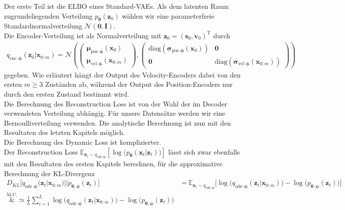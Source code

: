 \documentclass[12pt]{article}
\newcommand{\E}{\mathbb{E}}
\begin{document}
	Der erste Teil ist die ELBO eines Standard-VAEs.
	Als dem latenten Raum zugrundeliegenden Verteilung $p_{\boldsymbol\theta}(\mathbf{z}_{0})$ wählen wir eine parameterfreie Standardnormalverteilung $\mathcal{N}(\mathbf{0},\mathbf{I})$.\\
	Die Encoder-Verteilung ist als Normalverteilung mit $\mathbf{z}_{0} = (\mathbf{s}_{0},\mathbf{v}_{0})^{\mathrm{T}}$ durch
	\begin{align*}
	q_{\text{enc }\boldsymbol\phi}(\mathbf{z}_{0}|\mathbf{x}_{0:m}) =
	\mathcal{N}\left(\left(\begin{array}{cc}
	\boldsymbol\mu_{\text{pos }\boldsymbol\phi}(\textbf{x}_{0}) \\
	\boldsymbol\mu_{\text{vel }\boldsymbol\phi}(\textbf{x}_{0:m})
	\end{array}\right),\left(\begin{array}{cc}
	\text{diag}(\boldsymbol\sigma_{\text{pos }\boldsymbol\phi}(\textbf{x}_{0})) &
	\mathbf{0}\\
	\mathbf{0} &
	\text{diag}(\boldsymbol\sigma_{\text{vel }\boldsymbol\phi}(\textbf{x}_{0:m}))
	\end{array}\right)\right)
	\end{align*}
	gegeben. Wie erläutert hängt der Output des Velocity-Encoders dabei von den ersten $m\ge3$ Zuständen ab, während der Output des Position-Encoders nur durch den ersten Zustand bestimmt wird.\\
	Die Berechnung des Reconstruction Loss ist von der Wahl der im Decoder verwendeten Verteilung abhängig. Für unsere Datensätze werden wir eine Bernoulliverteilung verwenden.
	Die analytische Berechnung ist nun mit den Resultaten des letzten Kapitels möglich.\\
	Die Berechnung des Dynamic Loss ist komplizierter. \\
	Der Reconstruction Loss $\E_{\mathbf{z}_{t}\sim q_{\text{ode }\boldsymbol\psi}}
	\left[\log\big(p_{\boldsymbol\theta}\left(\mathbf{x}_{t}|\mathbf{z}_{t}\right)\big)\right] $ lässt sich zwar ebenfalls mit den Resultaten des ersten Kapitels berechnen, für die approximative Berechnung der KL-Divergenz
	\begin{align*}
	D_{KL}\big[q_{\text{ode }\boldsymbol\psi}(\mathbf{z}_{t}|\mathbf{x}_{0:m})||p_{\boldsymbol\theta,\boldsymbol\psi}(\mathbf{z}_{t})\big]
	&=\mathbb{E}_{\mathbf{z}_{t}\sim q_{\text{ode }\boldsymbol\psi}}\big[\log\big(q_{\text{ode }\boldsymbol\psi}(\mathbf{z}_{t}|\mathbf{x}_{0:m}) \big) - \log\big(p_{\boldsymbol\theta,\boldsymbol\psi}(\mathbf{z}_{t}) \big)\big] \\
	\overset{\text{M.C.}}&{\simeq} \frac{1}{L} \sum_{i=1}^{L} \log\big(q_{\text{ode }\boldsymbol\psi}(\mathbf{z}_{t}|\mathbf{x}_{0:m}) \big) - \log\big(p_{\boldsymbol\theta,\boldsymbol\psi}(\mathbf{z}_{t}) \big)
	\end{align*}
\end{document}
